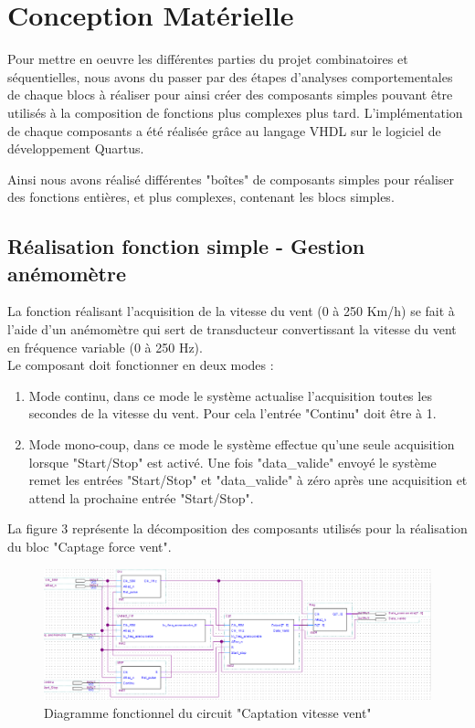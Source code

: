 \section{Conception Matérielle}
Pour mettre en oeuvre les différentes parties du projet combinatoires et séquentielles, nous avons du passer par des étapes d'analyses comportementales de chaque blocs à réaliser pour ainsi créer des composants simples pouvant être utilisés à la composition de fonctions plus complexes plus tard. L'implémentation de chaque composants a été réalisée grâce au langage VHDL sur le logiciel de développement Quartus.

Ainsi nous avons réalisé différentes "boîtes" de composants simples pour réaliser des fonctions entières, et plus complexes, contenant les blocs simples.

\subsection{Réalisation fonction simple - Gestion anémomètre}
La fonction réalisant l'acquisition de la vitesse du vent (0 à 250 Km/h) se fait à l'aide d'un anémomètre qui sert de transducteur convertissant la vitesse du vent en fréquence variable (0 à 250 Hz). 
\vspace{0.5cm}\\
Le composant doit fonctionner en deux modes :
\begin{enumerate}
    \item Mode continu, dans ce mode le système actualise l'acquisition toutes les secondes de la vitesse du vent. Pour cela l'entrée "Continu" doit être à 1. 
    \item Mode mono-coup, dans ce mode le système effectue qu'une seule acquisition lorsque "Start/Stop" est activé. Une fois "data\_valide" envoyé le système remet les entrées "Start/Stop" et "data\_valide" à zéro après une acquisition et attend la prochaine entrée "Start/Stop".
\end{enumerate}
\vspace{0.5cm}
La figure 3 représente la décomposition des composants utilisés pour la réalisation du bloc "Captage force vent". 

\begin{figure}[h]
    \begin{center}
      \includegraphics[width=\textwidth]{images/captation.png}
      \caption{Diagramme fonctionnel du circuit "Captation vitesse vent"}
    \end{center}
  \end{figure}

